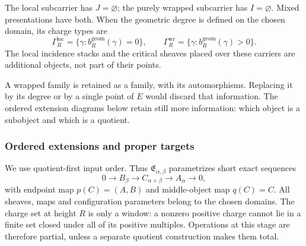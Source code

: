 \begin{definition}
\label{def:hybrid-local-stratum-prestack}
\label{def:hybrid-wrapped-stratum-prestack}
The local subcarrier has $J=\varnothing$; the purely wrapped
subcarrier has $I=\varnothing$. Mixed presentations have both.
When the geometric degree is defined on the chosen domain, its
charge types are
\begin{equation}
\label{eq:hybrid-loc-wr-windows}
 \Gamma_R^{\mathrm{loc}}=\{\gamma:b_R^{\mathrm{geom}}(\gamma)=0\},
 \qquad
 \Gamma_R^{\mathrm{wr}}=\{\gamma:b_R^{\mathrm{geom}}(\gamma)>0\}.
\end{equation}
The local incidence stacks and the critical sheaves placed over
these carriers are additional objects, not part of their points.
\end{definition}

A wrapped family is retained as a family, with its automorphisms.
Replacing it by its degree or by a single point of $E$ would discard
that information. The ordered extension diagrams below retain still
more information: which object is a subobject and which is a quotient.

\subsubsection*{Ordered extensions and proper targets}

We use quotient-first input order. Thus
$\mathfrak E_{\alpha,\beta}$ parametrizes short exact sequences
\[
 0\longrightarrow B_\beta\longrightarrow C_{\alpha+\beta}
 \longrightarrow A_\alpha\longrightarrow0,
\]
with endpoint map $p(C)=(A,B)$ and middle-object map $q(C)=C$.
All sheaves, maps and configuration parameters belong to the chosen
domains. The charge set at height $R$ is only a window: a nonzero
positive charge cannot lie in a finite set closed under all of its
positive multiples. Operations at this stage are therefore partial,
unless a separate quotient construction makes them total.

